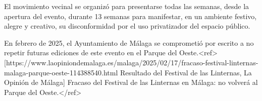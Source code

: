 El movimiento vecinal se organizó para presentarse todas las semanas, desde la apertura del evento, durante 13 semanas para manifestar, en un ambiente festivo, alegre y creativo, su disconformidad por el uso privatizador del espacio público.

En febrero de 2025, el Ayuntamiento de Málaga se comprometió por escrito a no repetir futuras ediciones de este evento en el Parque del Oeste.<ref>[https://www.laopiniondemalaga.es/malaga/2025/02/17/fracaso-festival-linternas-malaga-parque-oeste-114388540.html Resultado del Festival de las Linternas, La Opinión de Málaga] Fracaso del Festival de las Linternas en Málaga: no volverá al Parque del Oeste.</ref>